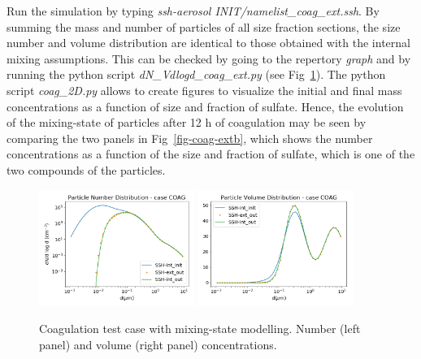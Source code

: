 \documentclass[a4paper,11pt]{article}
\begin{document}
Run the simulation by typing {\it{ssh-aerosol INIT/namelist\_coag\_ext.ssh}}.
By summing the mass and number of particles of all size fraction sections, the
size number and volume distribution are identical to those obtained with the
internal mixing assumptions. This can be checked by going to the repertory
{\it{graph}} and by running the python script {\it{dN\_Vdlogd\_coag\_ext.py}}
(see Fig~\ref{fig-coag-ext}).
The python script {\it{coag\_2D.py}} allows to create figures to visualize the initial and final mass concentrations as a function of size and fraction of sulfate.
Hence, the evolution of the mixing-state of particles after 12 h of coagulation may
be seen by comparing the two panels in Fig~\ref{fig-coag-extb}, which shows
the number concentrations as a function of the size and fraction of 
sulfate, which is one of the
two compounds of the particles.

\begin{figure}[H]
        \begin{center}
                \includegraphics[angle=0,width=0.45\textwidth]{../graph/figure_ref/dNdlogd_COAG_EXT.png}
                \includegraphics[angle=0,width=0.45\textwidth]{../graph/figure_ref/dVdlogd_COAG_EXT.png}
        \end{center}
\caption{Coagulation test case with mixing-state modelling. Number (left panel) and volume (right panel) concentrations.}
\label{fig-coag-ext}
\end{figure}
 
\end{document}
